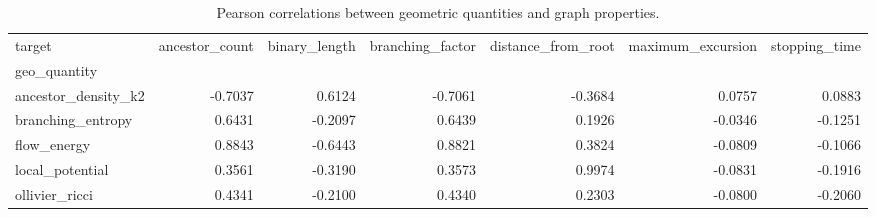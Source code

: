 \begin{table}
\caption{Pearson correlations between geometric quantities and graph properties.}
\label{tab:geo-correlations}
\begin{tabular}{lrrrrrr}
\toprule
target & ancestor_count & binary_length & branching_factor & distance_from_root & maximum_excursion & stopping_time \\
geo_quantity &  &  &  &  &  &  \\
\midrule
ancestor_density_k2 & -0.7037 & 0.6124 & -0.7061 & -0.3684 & 0.0757 & 0.0883 \\
branching_entropy & 0.6431 & -0.2097 & 0.6439 & 0.1926 & -0.0346 & -0.1251 \\
flow_energy & 0.8843 & -0.6443 & 0.8821 & 0.3824 & -0.0809 & -0.1066 \\
local_potential & 0.3561 & -0.3190 & 0.3573 & 0.9974 & -0.0831 & -0.1916 \\
ollivier_ricci & 0.4341 & -0.2100 & 0.4340 & 0.2303 & -0.0800 & -0.2060 \\
\bottomrule
\end{tabular}
\end{table}

